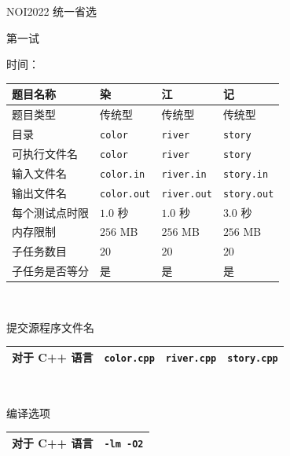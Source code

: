 \documentclass[12pt]{article}                               %
\title{\docTitle}
\author{\docAuthor}
\date{\docDate}
\makeatletter
\newcommand{\docSecTitle}{NOI2022 统一省选}
\newcommand{\docThiTitle}{第一试}
\renewcommand*\maketitle{                                   %
	\begin{center}
		{\LARGE \bfseries \@title \par}
		{\Huge \heiti \docSecTitle \par}
		{\LARGE \kaishu \docThiTitle \par}
		{\large \@author \par}
	  {\large \heiti 时间：\@date \par}
	\end{center}
	\setcounter{footnote}{0}
}
\makeatother
\begin{document}
	\maketitle
	\thispagestyle{fancy}
	\pagestyle{fancy}
	\renewcommand\headrulewidth{0pt}
	\fancyhf{}


	\begin{center}
		\begin{tabular}{|m{100.5pt}|m{102pt}|m{102pt}|m{102pt}|}
			\hline
			题目名称 & 染 & 江 & 记 \\
			\hline
			题目类型 & 传统型 & 传统型 & 传统型 \\
			\hline
			目录 & \lstinline|color| & \lstinline|river| & \lstinline|story| \\
			\hline
			可执行文件名 & \lstinline|color| & \lstinline|river| & \lstinline|story| \\
			\hline
			输入文件名 & \lstinline|color.in| & \lstinline|river.in| & \lstinline|story.in| \\
			\hline
			输出文件名 & \lstinline|color.out| & \lstinline|river.out| & \lstinline|story.out| \\
			\hline
			每个测试点时限 & $1.0$ 秒 & $1.0$ 秒 & $3.0$ 秒 \\
			\hline
			内存限制 & $256$ MB & $256$ MB & $256$ MB \\
			\hline
			子任务数目 & $20$ & $20$ & $20$ \\
			\hline
			子任务是否等分 & 是 & 是 & 是 \\
			\hline
		\end{tabular}\\
	\end{center}

	提交源程序文件名
	\begin{center}
		\begin{tabular}{|m{100.5pt}|m{102pt}|m{102pt}|m{102pt}|}
			\hline
			对于 C++ 语言 & \lstinline|color.cpp| & \lstinline|river.cpp| & \lstinline|story.cpp| \\
			\hline
		\end{tabular}\\
	\end{center}

	编译选项
	\begin{center}
		\begin{tabular}{|m{100.5pt}|m{331pt}<{\centering}|}
		\hline
		对于 C++ 语言 & \lstinline|-lm -O2| \\
		\hline
		\end{tabular}\\
	\end{center}
\end{document}

